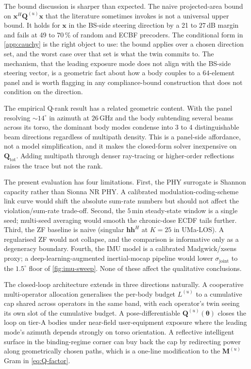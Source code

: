 \documentclass[journal,twocolumn,10pt]{IEEEtran}
\theoremstyle{plain}
\theoremstyle{remark}
\newcommand{\xx}{\mathbf{x}}
\newcommand{\hh}{\mathbf{h}}
\newcommand{\Qmat}{\mathbf{Q}}
\newcommand{\Mmat}{\mathbf{M}}
\begin{document}
The bound discussion is sharper than expected. The naive
projected-area bound on $\xx^H \Qmat^{(u)} \xx$ that the literature
sometimes invokes is not a universal upper bound. It holds for $\xx$
in the BS-side steering direction by a 21 to $27\,$dB margin and
fails at 49 to $70\,\%$ of random and ECBF precoders. The
conditional form in \cref{app:cauchy} is the right object to use:
the bound applies over a chosen direction set, and the worst case
over that set is what the twin commits to. The mechanism, that the
leading exposure mode does not align with the BS-side steering
vector, is a geometric fact about how a body couples to a
$64$-element panel and is worth flagging in any compliance-bound
construction that does not condition on the direction.

The empirical Q-rank result has a related geometric content. With
the panel resolving $\sim 14^\circ$ in azimuth at $26\,$GHz and the
body subtending several beams across its torso, the dominant body
modes condense into 3 to 4 distinguishable beam directions
regardless of multipath density. This is a panel-side affordance,
not a model simplification, and it makes the closed-form solver
inexpensive on $\Qmat_{\mathrm{tot}}$. Adding multipath through
denser ray-tracing or higher-order reflections raises the trace but
not the rank.

The present evaluation has four limitations. First, the PHY surrogate
is Shannon capacity rather than Sionna NR PHY. A calibrated
modulation-coding-scheme link curve would shift the absolute
sum-rate numbers but should not affect the violation/sum-rate
trade-off. Second, the $5\,$min steady-state window is a single seed;
multi-seed averaging would smooth the chronic-dose ECDF tails further.
Third, the ZF baseline is naive (singular $\hh \hh^H$ at $K = 25$ in
UMa-LOS). A regularised ZF would not collapse, and the comparison is
informative only as a degeneracy boundary. Fourth, the IMU model is
a calibrated Madgwick/xsens proxy; a deep-learning-augmented
inertial-mocap pipeline would lower $\sigma_{\mathrm{joint}}$ to the
$1.5^\circ$ floor of \cref{fig:imu-sweep}. None of these affect the
qualitative conclusions.

The closed-loop architecture extends in three directions naturally.
A cooperative multi-operator allocation generalises the per-body
budget $L^{(u)}$ to a cumulative cap shared across operators in the
same band, with each operator's twin seeing its own slot of the
cumulative budget. A pose-differentiable
$\Qmat^{(u)}(\bm\theta)$ closes the loop on tier-A bodies under
near-field user-equipment exposure where the leading mode's azimuth
depends strongly on torso orientation. A reflective intelligent
surface in the binding-regime corner can buy back the cap by
redirecting power along geometrically chosen paths, which is a
one-line modification to the $\Mmat^{(u)}$ Gram in
\cref{eq:Q-factor}.
\end{document}
